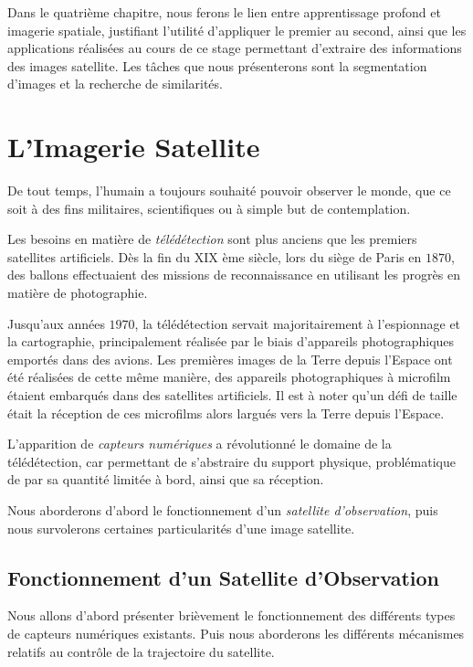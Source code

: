 \documentclass[a4paper, 11pt]{report}
\begin{document}
Dans le quatrième chapitre, nous ferons le lien entre apprentissage profond et imagerie spatiale, justifiant l'utilité d'appliquer le premier au second, ainsi que les applications réalisées au cours de ce stage permettant d'extraire des informations des images satellite. Les tâches que nous présenterons sont la segmentation d'images et la recherche de similarités.

\chapter{L'Imagerie Satellite}
De tout temps, l'humain a toujours souhaité pouvoir observer le monde, que ce soit à des fins militaires, scientifiques ou à simple but de contemplation.

Les besoins en matière de \emph{télédétection} sont plus anciens que les premiers satellites artificiels. Dès la fin du XIX ème siècle, lors du siège de Paris en $1870$, des ballons effectuaient des missions de reconnaissance en utilisant les progrès en matière de photographie.

Jusqu'aux années $1970$, la télédétection servait majoritairement à l'espionnage et la cartographie, principalement réalisée par le biais d'appareils photographiques emportés dans des avions.
Les premières images de la Terre depuis l'Espace ont été réalisées de cette même manière, des appareils photographiques à microfilm étaient embarqués dans des satellites artificiels. Il est à noter qu'un défi de taille était la réception de ces microfilms alors largués vers la Terre depuis l'Espace.

L'apparition de \emph{capteurs numériques} a révolutionné le domaine de la télédétection, car permettant de s'abstraire du support physique, problématique de par sa quantité limitée à bord, ainsi que sa réception.

Nous aborderons d'abord le fonctionnement d'un \emph{satellite d'observation}, puis nous survolerons certaines particularités d'une image satellite.
\section{Fonctionnement d'un Satellite d'Observation}
Nous allons d'abord présenter brièvement le fonctionnement des différents types de capteurs numériques existants.
Puis nous aborderons les différents mécanismes relatifs au contrôle de la trajectoire du satellite.
\end{document}
